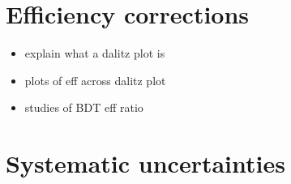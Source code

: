 \section{Efficiency corrections}
\label{sec:B2DsKK_effcorrection}

{\color{Red}
\begin{itemize}
\item explain what a dalitz plot is
\item plots of eff across dalitz plot
\item studies of BDT eff ratio 
\end{itemize}
}


\section{Systematic uncertainties}
\label{sec:B2DsKK_systuncertainy}


